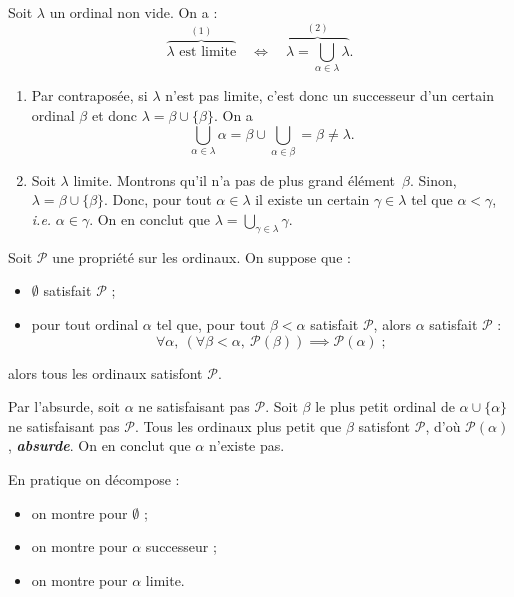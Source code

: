 \documentclass[./main]{subfiles}
\begin{document}
  \begin{prop}
    Soit $\lambda$ un ordinal non vide. On a :
    \[
      \overbrace{\lambda \text{ est limite}}^{(1)} \quad \iff \quad \overbrace{\lambda = \bigcup_{\alpha \in \lambda} \lambda}^{(2)}
    .\] 
  \end{prop}
  \begin{prv}
    \begin{enumerate}
      \item Par contraposée, si $\lambda$ n'est pas limite, c'est donc un successeur d'un certain ordinal $\beta$ et donc $\lambda = \beta \cup \{\beta\}$.
        On a \[
        \bigcup_{\alpha \in \lambda} \alpha = \beta \cup \bigcup_{\alpha \in \beta} = \beta \neq \lambda
        .\] 
      \item Soit $\lambda$ limite.
        Montrons qu'il n'a pas de plus grand élément~$\beta$.
        Sinon, $\lambda = \beta \cup \{\beta\}$.
        Donc, pour tout $\alpha \in \lambda$ il existe un certain $\gamma \in \lambda$ tel que $\alpha < \gamma$,  \textit{i.e.} $\alpha \in \gamma$.
        On en conclut que $\lambda = \bigcup_{\gamma \in \lambda} \gamma$.
    \end{enumerate}
  \end{prv}

  \begin{thm}
    Soit $\mathcal{P}$ une propriété sur les ordinaux.
    On suppose que :
    \begin{itemize}
      \item $\emptyset$ satisfait $\mathcal{P}$ ;
      \item pour tout ordinal $\alpha$ tel que, pour tout $\beta < \alpha$ satisfait $\mathcal{P}$, alors $\alpha$ satisfait $\mathcal{P}$ :
        \[
        \forall \alpha, \: (\forall \beta < \alpha, \: \mathcal{P}(\beta)) \implies \mathcal{P}(\alpha) \;
        ;\] 
    \end{itemize}
    alors tous les ordinaux satisfont $\mathcal{P}$.
  \end{thm}
  \begin{prv}
    Par l'absurde, soit $\alpha$ ne satisfaisant pas $\mathcal{P}$.
    Soit $\beta$ le plus petit ordinal de $\alpha \cup \{\alpha\}$ ne satisfaisant pas $\mathcal{P}$.
    Tous les ordinaux plus petit que $\beta$ satisfont $\mathcal{P}$, d'où $\mathcal{P}(\alpha)$, \textit{\textbf{absurde}}.
    On en conclut que $\alpha$ n'existe pas.
  \end{prv}

  \begin{rmk}
    En pratique on décompose :
    \begin{itemize}
      \item on montre pour $\emptyset$ ;
      \item on montre pour $\alpha$ successeur ;
      \item on montre pour $\alpha$ limite.
    \end{itemize}
  \end{rmk}
\end{document}
